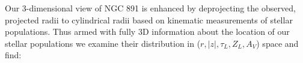 

Our 3-dimensional view of NGC 891 is enhanced by deprojecting the
observed, projected radii to cylindrical radii based on kinematic
measurements of stellar populations. Thus armed with fully 3D
information about the location of our stellar populations we examine
their distribution in ($r,|z|,\tau_L,Z_L,A_V$) space and find:


